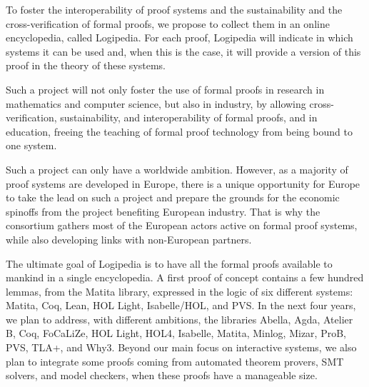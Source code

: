 To foster the interoperability of proof systems and the sustainability
and the cross-verification of formal proofs, we propose to collect
them in an online encyclopedia, called Logipedia.  For each proof,
Logipedia will indicate in which systems it can be used and, when this
is the case, it will provide a version of this proof in the theory of
these systems.

Such a project will not only foster the use of formal proofs in
research in mathematics and computer science, but also in industry, by
allowing cross-verification, sustainability, and interoperability of
formal proofs, and in education, freeing the teaching of formal proof
technology from being bound to one system.

Such a project can only have a worldwide ambition. However, as a
majority of proof systems are developed in Europe, there is a unique
opportunity for Europe to take the lead on such a project and prepare
the grounds for the economic spinoffs from the project benefiting
European industry. That is why the consortium gathers most of the
European actors active on formal proof systems, while also developing
links with non-European partners.

The ultimate goal of Logipedia is to have all the formal proofs
available to mankind in a single encyclopedia.  A first proof of
concept contains a few hundred lemmas, from the Matita library,
expressed in the logic of six different systems: Matita, Coq, Lean,
HOL Light, Isabelle/HOL, and PVS.  In the next four years, we plan to
address, with different ambitions, the libraries Abella, Agda, Atelier
B, Coq, FoCaLiZe, HOL Light, HOL4, Isabelle, Matita, Minlog, Mizar,
ProB, PVS, TLA+, and Why3.  Beyond our main focus on interactive
systems, we also plan to integrate some proofs coming from automated
theorem provers, SMT solvers, and model checkers, when these proofs
have a manageable size.


